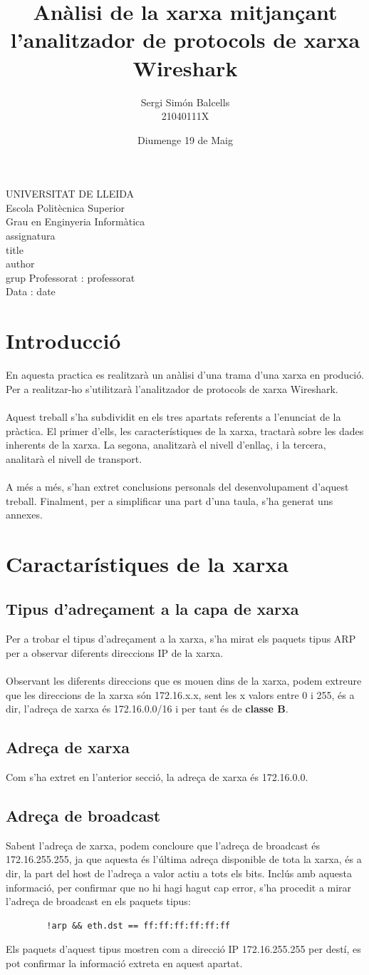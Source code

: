\documentclass{article}
\title{Anàlisi de la xarxa mitjançant l'analitzador de protocols de xarxa Wireshark}
\author{Sergi Simón Balcells\\21040111X}
\date{Diumenge 19 de Maig}
\renewcommand{\maketitle}{ %
    \begin{titlepage}
        \raggedright{UNIVERSITAT DE LLEIDA \\
            Escola Politècnica Superior \\
            Grau en Enginyeria Informàtica\\
            \1assignatura\\}
            \vspace{5cm}
            \centering\huge{\5title \\}
            \vspace{3cm}
            \large{\6author} \\
            \normalsize{\3grup}
            \vfill
            Professorat : \4professorat \\
            Data : \7date
\end{titlepage}}
\begin{document}
\maketitle
\thispagestyle{empty}

\newpage
{}
\tableofcontents
\listoffigures
\listoftables
\newpage
{}
\section{Introducció}
En aquesta practica es realitzarà un anàlisi d'una trama 
d'una xarxa en produció. Per a realitzar-ho s'utilitzarà
l'analitzador de protocols de xarxa Wireshark.\\
\\
Aquest treball s'ha subdividit en els tres apartats referents a l'enunciat 
de la pràctica. El primer d'ells, les característiques de la xarxa, tractarà 
sobre les dades inherents de la xarxa. La segona, analitzarà el nivell 
d'enllaç, i la tercera, analitarà el nivell de transport.\\
\\
A més a més, s'han extret conclusions personals del desenvolupament d'aquest
treball. Finalment, per a simplificar una part d'una taula, s'ha generat
uns annexes.
\section{Caractarístiques de la xarxa}
\subsection{Tipus d'adreçament a la capa de xarxa}
Per a trobar el tipus d'adreçament a la xarxa, s'ha mirat els paquets
tipus ARP per a observar diferents direccions IP de la xarxa.\\
\\
Observant les diferents direccions que es mouen dins de la xarxa, podem
extreure que les direccions de la xarxa són 172.16.x.x, sent les x valors
entre 0 i 255, és a dir, l'adreça de xarxa és 172.16.0.0/16 i per tant
és de  \textbf{classe B}.
\subsection{Adreça de xarxa}
Com s'ha extret en l'anterior secció, la adreça de xarxa és 172.16.0.0.
\subsection{Adreça de broadcast}
Sabent l'adreça de xarxa, podem concloure que
l'adreça de broadcast és 172.16.255.255, ja que aquesta és l'última adreça
disponible de tota la xarxa, és a dir, la part del host de l'adreça a valor
actiu a tots els bits. Inclús amb aquesta informació, per confirmar que no
hi hagi hagut cap error, s'ha procedit a mirar l'adreça de broadcast en els
paquets tipus:\\
\begin{lstlisting}
	    !arp && eth.dst == ff:ff:ff:ff:ff:ff
\end{lstlisting}
Els paquets d'aquest tipus mostren com a direcció IP 172.16.255.255 per destí,
es pot confirmar la informació extreta en aquest apartat.
\end{document}
